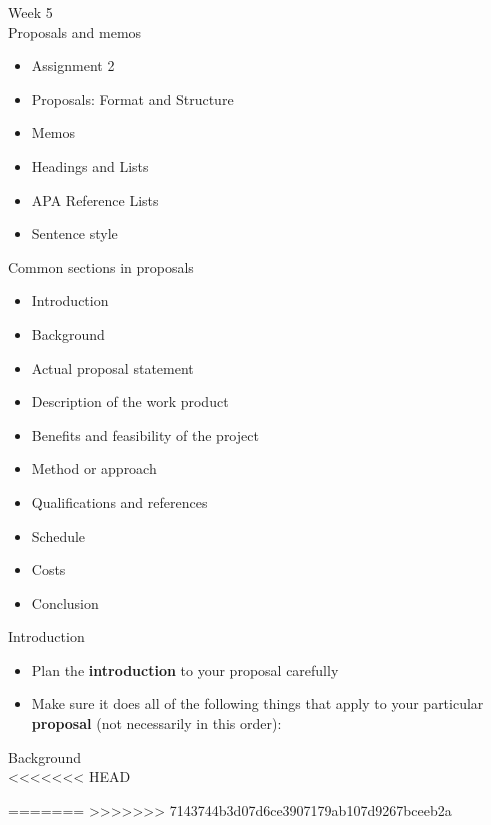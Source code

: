 \documentclass[]{article}
\begin{document}
	\Large{Week 5}\\
	\large{Proposals and memos}
	\normalsize
	\begin{itemize}
		\item Assignment 2
		\item Proposals: Format and Structure
		\item Memos
		\item Headings and Lists
		\item APA Reference Lists
		\item Sentence style
	\end{itemize}
	\vspace{5mm}
	\large{Common sections in proposals}
	\normalsize
	\begin{itemize}
		\item Introduction
		\item Background
		\item Actual proposal statement
		\item Description of the work product
		\item Benefits and feasibility of the project
		\item Method or approach
		\item Qualifications and references
		\item Schedule
		\item Costs
		\item Conclusion
	\end{itemize}
	\vspace{5mm}
	\large{Introduction}
	\normalsize
	\begin{itemize}
		\item Plan the {\bf introduction} to your proposal carefully
		\item Make sure it does all of the following things that apply to your particular {\bf proposal} (not necessarily in this order):
	\end{itemize}
	\vspace{5mm}
	\large{Background}\\
	\normalsize
<<<<<<< HEAD
	
=======
>>>>>>> 7143744b3d07d6ce3907179ab107d9267bceeb2a
\end{document}
